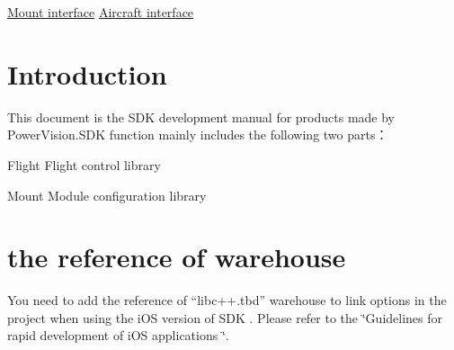 \hyperlink{mount-page}{Mount interface} \hyperlink{flight-page}{Aircraft interface}\hypertarget{index_Brief}{}\section{Introduction}\label{index_Brief}
This document is the S\+DK development manual for products made by Power\+Vision.\+S\+DK function mainly includes the following two parts：

\begin{DoxyItemize}
\item Flight Flight control library \item Mount Module configuration library\end{DoxyItemize}
\hypertarget{index_About}{}\section{the reference of warehouse}\label{index_About}
You need to add the reference of “libc++.tbd” warehouse to link options in the project when using the i\+OS version of S\+DK . Please refer to the \char`\"{}\+Guidelines for rapid development of i\+O\+S applications \char`\"{}. 